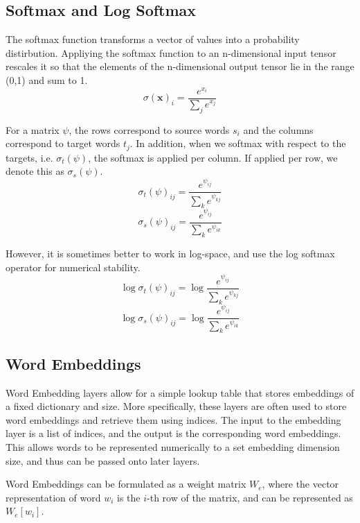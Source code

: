 \documentclass[twoside,twocolumn]{article}
\renewcommand{\vec}[1]{\mathbf{#1}}
\begin{document}
\subsection{Softmax and Log Softmax}
The softmax function transforms a vector of values into a probability distirbution. Appliying the softmax function to an n-dimensional input tensor rescales it so that the elements of the n-dimensional output tensor lie in the range (0,1) and sum to 1.
\begin{equation}
  \sigma(\vec{x})_i = \frac{e^{x_i}}{\sum_j e^{x_j}}
\end{equation}

For a matrix $\psi$, the rows correspond to source words $s_i$ and the columns correspond to target words $t_j$. In addition, when we softmax with respect to the targets, i.e. $\sigma_t(\psi)$, the softmax is applied per column. If applied per row, we denote this as $\sigma_s(\psi)$.
\begin{equation}
  \sigma_t(\psi)_{ij} = \frac{e^{\psi_{ij}}}{\sum_{k} e^{\psi_{kj}}}
\end{equation}
\begin{equation}
  \sigma_s(\psi)_{ij} = \frac{e^{\psi_{ij}}}{\sum_{k} e^{\psi_{ik}}}
\end{equation}

However, it is sometimes better to work in log-space, and use the log softmax operator for numerical stability.
\begin{equation}
  \log \sigma_t(\psi)_{ij} = \log \frac{e^{\psi_{ij}}}{\sum_{k} e^{\psi_{kj}}}
\end{equation}
\begin{equation}
  \log \sigma_s(\psi)_{ij} = \log \frac{e^{\psi_{ij}}}{\sum_{k} e^{\psi_{ik}}}
\end{equation}

\subsection{Word Embeddings}
Word Embedding layers allow for a simple lookup table that stores embeddings of a fixed dictionary and size. More specifically, these layers are often used to store word embeddings and retrieve them using indices. The input to the embedding layer is a list of indices, and the output is the corresponding word embeddings. This allows words to be represented numerically to a set embedding dimension size, and thus can be passed onto later layers.

Word Embeddings can be formulated as a weight matrix $W_e$, where the vector representation of word $w_i$ is the $i$-th row of the matrix, and can be represented as
$W_e[w_i]$.
\end{document}
